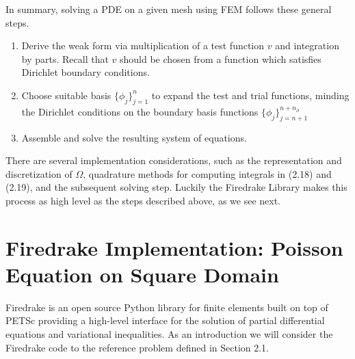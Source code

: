 \documentclass[12 pt]{report}
\begin{document}
In summary, solving a PDE on a given mesh using FEM follows these general steps. 
\begin{enumerate}
  \item Derive the weak form via multiplication of a test function $v$ and integration by parts. Recall that $v$ should be chosen from a function which satisfies Dirichlet boundary conditions.
  \item Choose suitable basis $\{\phi_j\}_{j = 1}^{n}$ to expand the test and trial functions, minding the Dirichlet conditions on the boundary basis functions $\{\phi_j\}_{j = n + 1}^{n + n_\partial}$
  \item Assemble and solve the resulting system of equations.  
\end{enumerate}

There are several implementation considerations, such as the representation and discretization of $\Omega$, quadrature methods for computing integrals in (2.18) and (2.19), and the subsequent solving step. Luckily the Firedrake Library \citep{ham_firedrake_2023} makes this process as high level as the steps described above, as we see next.

\section{Firedrake Implementation: Poisson Equation on Square Domain}

Firedrake \citep{ham_firedrake_2023} is an open source Python library for finite elements built on top of PETSc \citep{balay_petsc_2015} providing a high-level interface for the solution of partial differential equations and variational inequalities. As an introduction we will consider the Firedrake code to the reference problem defined in Section 2.1.
\end{document}

